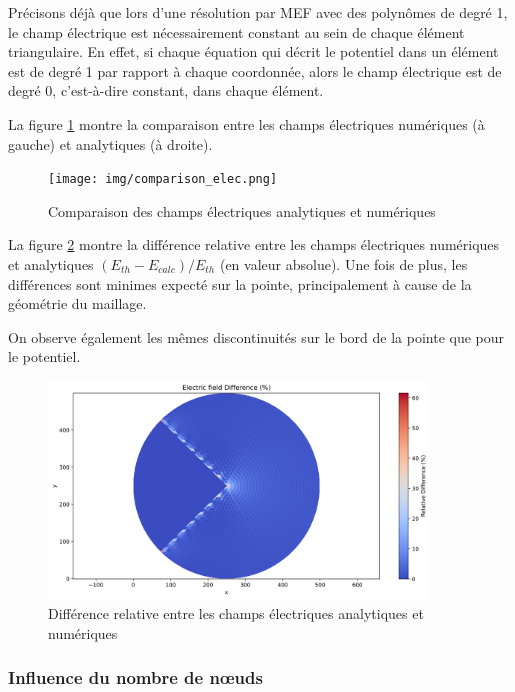 \documentclass{article}
\begin{document}
Précisons déjà que lors d'une résolution par MEF avec des polynômes
de degré 1, le champ électrique est nécessairement constant
au sein de chaque élément triangulaire. En effet, si chaque
équation qui décrit le potentiel dans un élément est de degré 1
par rapport à chaque coordonnée, alors le champ électrique
est de degré 0, c'est-à-dire constant, dans chaque élément.

\newpage

La figure \ref{fig:field_comparison} montre la comparaison
entre les champs électriques
numériques (à gauche) et analytiques (à droite).


\begin{figure}[!h]
    \centering
    \texttt{[image: img/comparison\_elec.png]}
    \caption{Comparaison des champs électriques analytiques et numériques}
    \label{fig:field_comparison}
\end{figure}

La figure \ref{fig:field_diff} montre la différence relative entre
les champs électriques numériques et analytiques
$(E_{th} - E_{calc}) / E_{th}$ (en valeur absolue). Une fois
de plus, les différences sont minimes expecté sur la pointe,
principalement à cause de la géométrie du maillage.

On observe également les mêmes discontinuités sur le bord
de la pointe que pour le potentiel.

\begin{figure}[!h]
    \centering
    \includegraphics[width=0.9\textwidth]{img/difference_elec.png}
    \caption{Différence relative entre les champs électriques analytiques et numériques}
    \label{fig:field_diff}
\end{figure}

\newpage

\subsubsection{Influence du nombre de nœuds}
\end{document}
